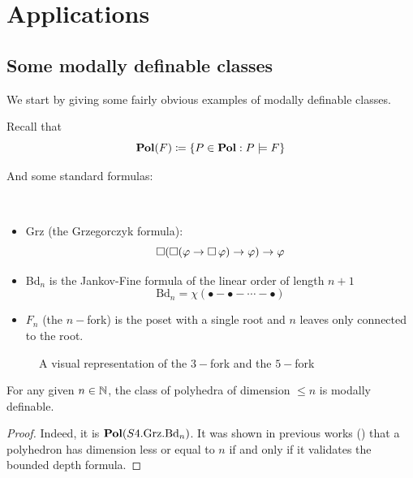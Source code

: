 \section{Applications}
\subsection{Some modally definable classes}
We start by giving some fairly obvious examples of modally definable classes.

Recall that 
\[\operatorname{\textbf{Pol}}(F)\coloneqq \left\{ P\in\operatorname{\textbf{Pol}}:P\models F \right\}\]

And some standard formulas: 
\begin{definition}$ $\\
    \begin{itemize}
        \item Grz (the Grzegorczyk formula): \[\operatorname{\Box}(\operatorname{\Box}(\varphi\to\operatorname{\Box}\varphi)\to\varphi)\to \varphi\]
        \item Bd$_n$ is the Jankov-Fine formula of the linear order of length $n+1$ 
        \[\text{Bd}_n=\chi(\bullet - \bullet -\cdots -\bullet)\]
        \item $F_n$ (the $n-$fork) is the poset with a single root and $n$ leaves only connected to the root.
    \end{itemize}
\end{definition}
\begin{figure}[H]
    \centering 
\caption{A visual representation of the $3-$fork and the $5-$fork}
\end{figure}
\begin{proposition}
    For any given $n\in\operatorname{\mathbb{N}}$, the class of polyhedra of dimension
    $\leq n$ is modally definable.
\end{proposition}
\begin{proof}
    Indeed, it is $\operatorname{\textbf{Pol}}(S4.\text{Grz}.\text{Bd}_n)$.
    It was shown in previous works (\cite{DBLP,Dekker}) that a polyhedron has dimension 
    less or equal to $n$ if and only if it validates the bounded depth formula.
\end{proof}

